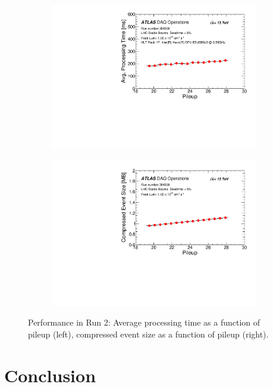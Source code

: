 \begin{figure}[t!]
\centering
\begin{subfigure}[t]{0.48\textwidth}
\includegraphics[width=.95\textwidth]{hProf_run_304008_pileup_AvgProcessingTime.pdf}
\end{subfigure}
\begin{subfigure}[t]{0.48\textwidth}
\includegraphics[width=.95\textwidth]{hProf_run_304008_pileup_EventSize.pdf}
\end{subfigure}
\vspace{-0.3cm}
\caption{Performance in Run 2: Average processing time as a function of pileup (left), compressed event size as a function of pileup (right).}
\label{fig:run_pileup}
\end{figure} 

\section{Conclusion}

